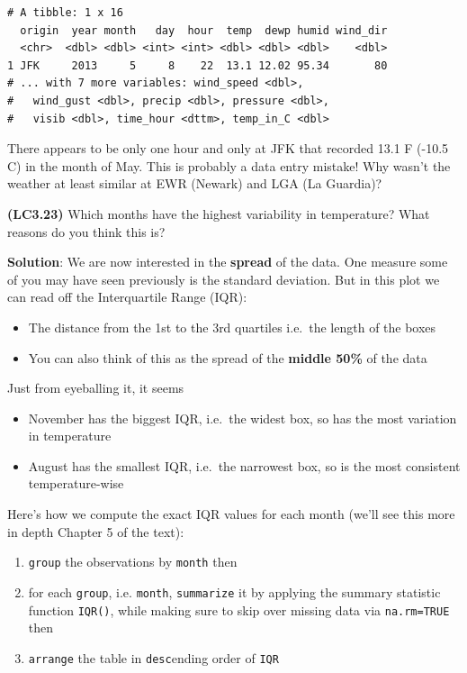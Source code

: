 \documentclass[12pt, krantz2,]{krantz}
\providecommand{\tightlist}{%
  \setlength{\itemsep}{0pt}\setlength{\parskip}{0pt}}
\begin{document}
\begin{verbatim}
# A tibble: 1 x 16
  origin  year month   day  hour  temp  dewp humid wind_dir
  <chr>  <dbl> <dbl> <int> <int> <dbl> <dbl> <dbl>    <dbl>
1 JFK     2013     5     8    22  13.1 12.02 95.34       80
# ... with 7 more variables: wind_speed <dbl>,
#   wind_gust <dbl>, precip <dbl>, pressure <dbl>,
#   visib <dbl>, time_hour <dttm>, temp_in_C <dbl>
\end{verbatim}

There appears to be only one hour and only at JFK that recorded 13.1 F (-10.5 C) in the month of May. This is probably a data entry mistake! Why wasn't the weather at least similar at EWR (Newark) and LGA (La Guardia)?

\textbf{(LC3.23)} Which months have the highest variability in temperature? What reasons do you think this is?

\textbf{Solution}: We are now interested in the \textbf{spread} of the data. One measure some of you may have seen previously is the standard deviation. But in this plot we can read off the Interquartile Range (IQR):

\begin{itemize}
\tightlist
\item
  The distance from the 1st to the 3rd quartiles i.e.~the length of the boxes
\item
  You can also think of this as the spread of the \textbf{middle 50\%} of the data
\end{itemize}

Just from eyeballing it, it seems

\begin{itemize}
\tightlist
\item
  November has the biggest IQR, i.e.~the widest box, so has the most variation in temperature
\item
  August has the smallest IQR, i.e.~the narrowest box, so is the most consistent temperature-wise
\end{itemize}

Here's how we compute the exact IQR values for each month (we'll see this more in depth Chapter 5 of the text):

\begin{enumerate}
\def\labelenumi{\arabic{enumi}.}
\tightlist
\item
  \texttt{group} the observations by \texttt{month} then
\item
  for each \texttt{group}, i.e. \texttt{month}, \texttt{summarize} it by applying the summary statistic function \texttt{IQR()}, while making sure to skip over missing data via \texttt{na.rm=TRUE} then
\item
  \texttt{arrange} the table in \texttt{desc}ending order of \texttt{IQR}
\end{enumerate}
\end{document}
